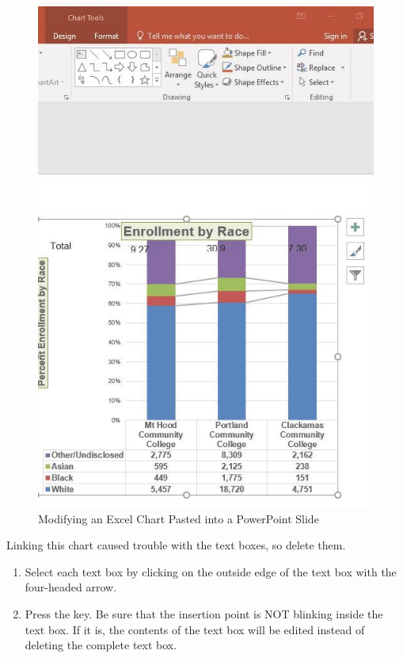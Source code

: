 \begin{figure}[H]
	\centering
	\includegraphics[width=\maxwidth{.95\linewidth}]{gfx/ch04_fig47}
	\caption{Modifying an Excel Chart Pasted into a PowerPoint Slide}
	\label{04:fig47}
\end{figure}

Linking this chart caused trouble with the text boxes, so delete them.

\begin{enumerate}
	\item Select each text box by clicking on the outside edge of the text box with the four-headed arrow.
	\item Press the  key. Be sure that the insertion point is NOT blinking inside the text box. If it is, the contents of the text box will be edited instead of deleting the complete text box.
\end{enumerate}

